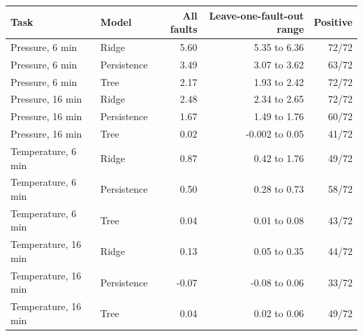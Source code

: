 \begin{tabular}{@{}llrrr@{}}
\toprule
Task & Model & All faults & Leave-one-fault-out range & Positive \\
\midrule
Pressure, 6 min & Ridge & 5.60 & 5.35 to 6.36 & 72/72 \\
Pressure, 6 min & Persistence & 3.49 & 3.07 to 3.62 & 63/72 \\
Pressure, 6 min & Tree & 2.17 & 1.93 to 2.42 & 72/72 \\
Pressure, 16 min & Ridge & 2.48 & 2.34 to 2.65 & 72/72 \\
Pressure, 16 min & Persistence & 1.67 & 1.49 to 1.76 & 60/72 \\
Pressure, 16 min & Tree & 0.02 & -0.002 to 0.05 & 41/72 \\
Temperature, 6 min & Ridge & 0.87 & 0.42 to 1.76 & 49/72 \\
Temperature, 6 min & Persistence & 0.50 & 0.28 to 0.73 & 58/72 \\
Temperature, 6 min & Tree & 0.04 & 0.01 to 0.08 & 43/72 \\
Temperature, 16 min & Ridge & 0.13 & 0.05 to 0.35 & 44/72 \\
Temperature, 16 min & Persistence & -0.07 & -0.08 to 0.06 & 33/72 \\
Temperature, 16 min & Tree & 0.04 & 0.02 to 0.06 & 49/72 \\
\bottomrule
\end{tabular}
